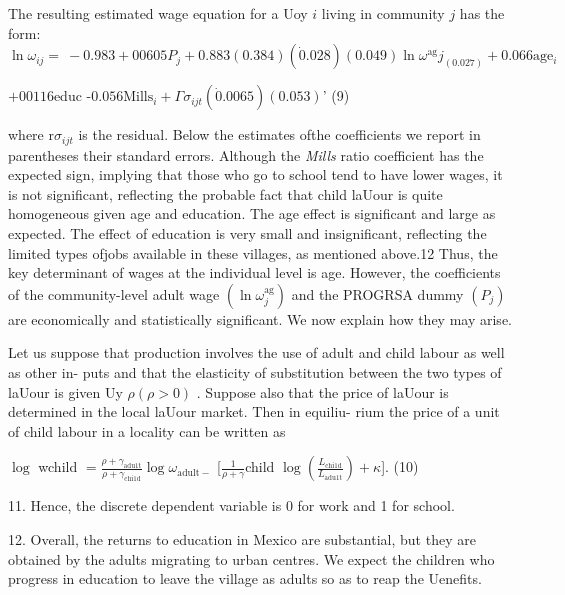 The resulting estimated wage equation for a Uoy $i$ living in community $j$ has the form:
$$
\ln\omega_{ij}=\ -0.983+00605P_{j}+0.883(0.384)(\dot{0}.028)(0.049)\ln\omega^{\mathrm{a}\mathrm{g}}j_{(0.027)}+0.066\mathrm{a}\mathrm{g}\mathrm{e}_{i}
$$
\begin{center}
$+00116$educ -$0.056\mathrm{M}\mathrm{i}\mathrm{l}\mathrm{l}\mathrm{s}_{i}+\Gamma\sigma_{ijt}(\dot{0}.0065)(0.053)$'   (9)
\end{center}
where $\mathrm{r}\sigma_{ijt}$ is the residual. Below the estimates ofthe coefficients we report in parentheses their standard errors. Although the {\it Mills} ratio coefficient has the expected sign, implying that those who go to school tend to have lower wages, it is not significant, reflecting the probable fact that child laUour is quite homogeneous given age and education. The age effect is significant and large as expected. The effect of education is very small and insignificant, reflecting the limited types ofjobs available in these villages, as mentioned above.12 Thus, the key determinant of wages at the individual level is age. However, the coefficients of the community-level adult wage $(\ln\omega_{j}^{\mathrm{a}\mathrm{g}})$ and the PROGRSA dummy $(P_{j})$ are economically and statistically significant. We now explain how they may arise.

Let us suppose that production involves the use of adult and child labour as well as other in- puts and that the elasticity of substitution between the two types of laUour is given Uy $\rho(\rho>0)$ . Suppose also that the price of laUour is determined in the local laUour market. Then in equiliu- rium the price of a unit of child labour in a locality can be written as
\begin{center}
$\log$ wchild $= \displaystyle \frac{\rho+\gamma_{\mathrm{a}\mathrm{d}\mathrm{u}1\mathrm{t}}}{\rho+\gamma_{\mathrm{c}\mathrm{h}\mathrm{i}1\mathrm{d}}}\log\omega_{\mathrm{a}\mathrm{d}\mathrm{u}\mathrm{l}\mathrm{t}-}$ [$\displaystyle \frac{1}{\rho+\gamma}$child $\displaystyle \log(\frac{L_{\mathrm{c}\mathrm{h}\mathrm{i}1\mathrm{d}}}{L_{\mathrm{a}\mathrm{d}\mathrm{u}1\mathrm{t}}})+\kappa$].   (10)
\end{center}
11. Hence, the discrete dependent variable is $0$ for work and 1 for school.

12. Overall, the returns to education in Mexico are substantial, but they are obtained by the adults migrating to urban centres. We expect the children who progress in education to leave the village as adults so as to reap the Uenefits.

